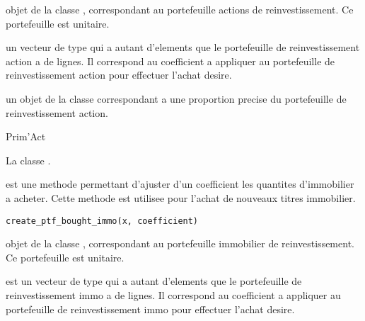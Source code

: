 \documentclass[a4paper]{book}
\begin{document}
%
\begin{Arguments}
\begin{ldescription}
\item[\code{x}] objet de la classe , correspondant au portefeuille actions de reinvestissement.
Ce portefeuille est unitaire.

\item[\code{coefficient}] un vecteur de type  qui a autant d'elements
que le portefeuille de reinvestissement action a de lignes.
Il correspond au coefficient a appliquer au portefeuille de reinvestissement action
pour effectuer l'achat desire.
\end{ldescription}
\end{Arguments}
%
\begin{Value}
 un objet de la classe  correspondant a une
proportion precise du portefeuille de reinvestissement action.
\end{Value}
%
\begin{Author}\relax
Prim'Act
\end{Author}
%
\begin{SeeAlso}\relax
La classe .
\end{SeeAlso}
%
\begin{Description}\relax
{} est une methode permettant d'ajuster d'un coefficient les quantites
d'immobilier a acheter. Cette methode est utilisee pour l'achat de nouveaux titres immobilier.
\end{Description}
%
\begin{Usage}
\begin{verbatim}
create_ptf_bought_immo(x, coefficient)
\end{verbatim}
\end{Usage}
%
\begin{Arguments}
\begin{ldescription}
\item[\code{x}] objet de la classe , correspondant au portefeuille immobilier de reinvestissement.
Ce portefeuille est unitaire.

\item[\code{coefficient}] est un vecteur de type  qui a autant d'elements
que le portefeuille de reinvestissement immo a de lignes. Il correspond au coefficient
a appliquer au portefeuille de reinvestissement immo pour effectuer l'achat desire.
\end{ldescription}
\end{Arguments}
\end{document}
